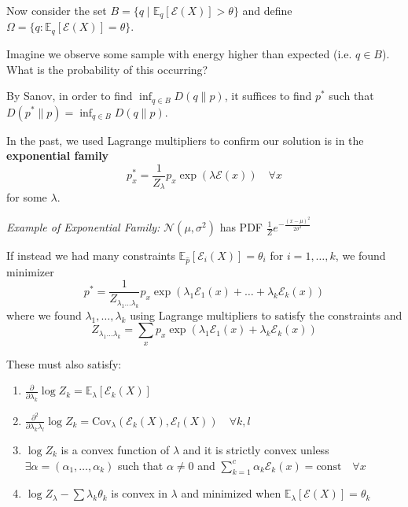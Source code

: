 \documentclass[12pt]{report}
\renewcommand{\hat}[1]{\widehat{#1}}
\newcommand{\E}{\mathbb{E}}
\newcommand{\Ec}{\mathcal{E}}
\newcommand*{\tbf}[1]{\ifmmode\mathbf{#1}\else\textbf{#1}\fi}
\begin{document}
Now consider the set $B = \{q \; | \; \E_q [\Ec(X)] > \theta\}$ and define $\Omega = \{q: \E_q [\Ec(X)] = \theta\}$.

\begin{center}
\end{center}
Imagine we observe some sample with energy higher than expected (i.e. $q \in B$). What is the probability of this occurring?

By Sanov, in order to find $\inf_{q \in B} D(q \parallel p)$, it suffices to find $p^*$ such that $D(p^* \parallel p) = \inf_{q \in B} D(q \parallel p)$.

In the past, we used Lagrange multipliers to confirm our solution is in the \tbf{exponential family}
\[p_x^* = \frac{1}{Z_{\lambda}} p_x \exp(\lambda \Ec(x)) \quad \forall x\]
for some $\lambda$.

\emph{Example of Exponential Family:} $\mathcal{N}(\mu, \sigma^2)$ has PDF $\frac{1}{Z} e^{-\frac{(x- \mu)^2}{2\sigma^2}}$

If instead we had many constraints $\E_{\hat p} [\Ec_i(X)] = \theta_i$ for $i = 1, \dots, k$, we found minimizer
\[p^* = \frac{1}{Z_{\lambda_1 \dots \lambda_k}} p_x \exp(\lambda_1 \Ec_1(x) + \dots + \lambda_k \Ec_k(x))\]
where we found $\lambda_1, \dots, \lambda_k$ using Lagrange multipliers to satisfy the constraints and
\[Z_{\lambda_1\dots \lambda_k} = \sum_x p_x \exp(\lambda_1 \Ec_1(x) + \lambda_k \Ec_k(x))\]

These must also satisfy:
\begin{enumerate}
    \item $\frac{\partial}{\partial \lambda_k} \log Z_k = \E_{\lambda}[\Ec_k(X)]$
    \item $\frac{\partial^2}{\partial \lambda_k \lambda_l} \log Z_k = \text{Cov}_{\lambda}(\Ec_k(X), \Ec_l(X)) \quad \forall k, l$
    \item $\log Z_k$ is a convex function of $\lambda$ and it is strictly convex unless $\exists \alpha = (\alpha_1, \dots, \alpha_k)$ such that $\alpha \neq 0$ and $\sum_{k=1}^c \alpha_k \Ec_k(x) = \text{const} \quad \forall x$
    \item $\log Z_{\lambda} - \sum \lambda_k \theta_k$ is convex in $\lambda$ and minimized when $\E_{\lambda}[\Ec(X)] =\theta_k$
\end{enumerate}
\end{document}
